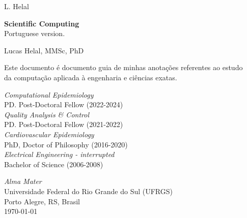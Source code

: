 \begin{titlepage}
  \begin{center}
    \vspace*{1cm}

    L. Helal

    \vspace{0.5cm}
    

    \vspace{4cm}
    {\Large{\textbf{Scientific Computing}}} \\
    Portuguese version.

    \vspace{1.5cm}

    \emph\small{{Lucas Helal}, MMSc, PhD}

    \vfill

    Este documento é documento guia de minhas anotações referentes ao estudo \\
    da computação aplicada à engenharia e ciências exatas.

    \vspace{1.0cm}

  
    \emph{Computational Epidemiology} \\
    PD. Post-Doctoral Fellow (2022-2024) \\
    \vspace{0.3cm}
    \emph{Quality Analysis \& Control} \\
    PD. Post-Doctoral Fellow (2021-2022) \\
    \vspace{0.3cm}
    \emph{Cardiovascular Epidemiology} \\
    PhD, Doctor of Philosophy (2016-2020) \\
    \vspace{0.3cm}
    \emph{Electrical Engineering - interrupted} \\
    Bachelor of Science (2006-2008)

    \vspace{0.8cm}
    \emph{Alma Mater} \\
    \vspace{1cm}
    Universidade Federal do Rio Grande do Sul (UFRGS) \\
    \small{Porto Alegre, RS, Brasil} \\
    \today \\

    \vspace{0.8cm}
  \end{center}
\end{titlepage}